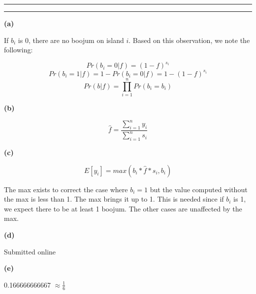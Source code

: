 \documentclass[11pt,letterpaper]{article}
\newcommand{\question}[1] {\vspace{.25in} \hrule\vspace{0.5em}
\noindent{\bf #1} \vspace{0.5em}
\hrule \vspace{.10in}}
\renewcommand{\part}[1] {\vspace{.10in} {\bf (#1)}}
\begin{document}
\question{4}
\part{a}

If $b_i$ is 0, there are no boojum on island $i$. Based on this observation, we note the following:

$$Pr(b_i = 0| f) = (1-f)^{s_i}$$
$$Pr(b_i = 1| f) = 1 - Pr(b_i = 0 | f) = 1 - (1-f)^{s_i}$$
$$Pr(b | f) = \prod_{i=1}^n Pr(b_i = b_i)$$

\part{b}

$$\hat{f} = \frac{\sum_{i=1}^n y_i}{\sum_{i=1}^n s_i} $$

\part{c}

$$E[y_i] = max(b_i * \hat{f} * s_i, b_i)$$

The max exists to correct the case where $b_i = 1$ but the value computed without the max is less than 1. The max brings it up to 1. This is needed since if $b_i$ is 1, we expect there to be at least 1 boojum.
The other cases are unaffected by the max.

\part{d}

Submitted online

\part{e}

0.166666666667 $\approx \frac{1}{6}$
\end{document}
